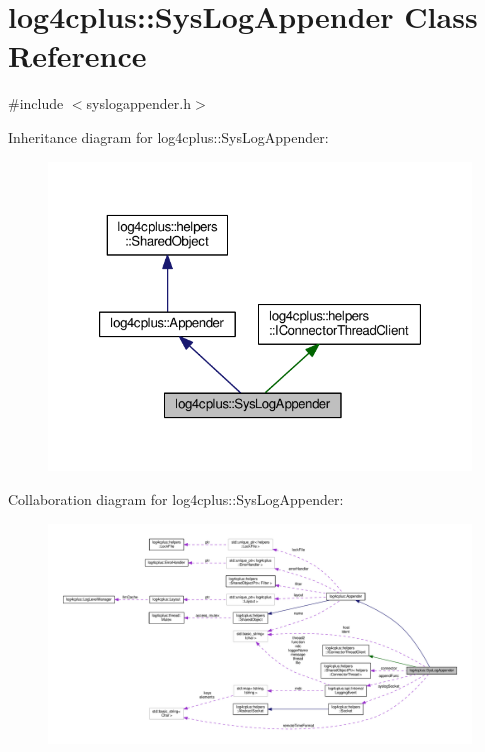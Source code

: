 \hypertarget{classlog4cplus_1_1SysLogAppender}{\section{log4cplus\-:\-:Sys\-Log\-Appender Class Reference}
\label{classlog4cplus_1_1SysLogAppender}
}


{\ttfamily \#include $<$syslogappender.\-h$>$}



Inheritance diagram for log4cplus\-:\-:Sys\-Log\-Appender\-:
\nopagebreak
\begin{figure}[H]
\begin{center}
\leavevmode
\includegraphics[width=323pt]{classlog4cplus_1_1SysLogAppender__inherit__graph}
\end{center}
\end{figure}


Collaboration diagram for log4cplus\-:\-:Sys\-Log\-Appender\-:
\nopagebreak
\begin{figure}[H]
\begin{center}
\leavevmode
\includegraphics[width=350pt]{classlog4cplus_1_1SysLogAppender__coll__graph}
\end{center}
\end{figure}
